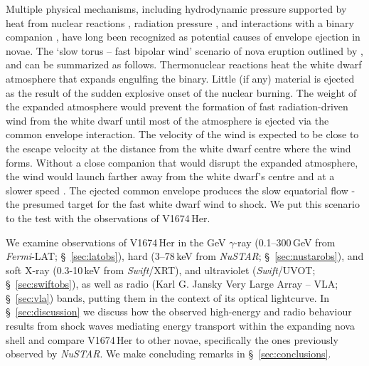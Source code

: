 \documentclass[a4paper,fleqn,usenatbib]{mnras}
\newcommand{\nova}{V1674\,Her}
\newcommand{\fermilat}{\emph{Fermi}-LAT}
\begin{document}
%
Multiple physical mechanisms, including 
hydrodynamic pressure supported by heat from nuclear reactions 
\citep{1969ApJ...156..569S,1978ApJ...226..186S,1986ApJ...310..222P}, 
radiation pressure \citep{1976MNRAS.175..305B,1978ApJ...220.1063S,1994ApJ...437..802K,2001MNRAS.326..126S}, 
and interactions with a binary companion
\citep{1985ApJ...294..263M,1990LNP...369..342L,1990ApJ...356..250L}, 
have long been recognized as potential causes of envelope ejection in novae.
%
The `slow torus -- fast bipolar wind' scenario of nova eruption outlined 
by \cite{1990LNP...369..342L,2014Natur.514..339C,2021ARA&A..59..391C,2019PhT....72k..38M}, and \cite{2022ApJ...938...31S} can be summarized as follows.
%
Thermonuclear reactions heat the white dwarf atmosphere that expands engulfing the binary. 
Little (if any) material is ejected 
as the result of the sudden explosive onset of the nuclear burning.
%
The weight of the expanded atmosphere would prevent the formation of fast radiation-driven wind from the white dwarf 
until most of the atmosphere is ejected via the common envelope interaction.
The velocity of the wind is expected to be close to the escape 
velocity at the distance from the white dwarf centre where the wind forms.
Without a close companion that would disrupt the expanded atmosphere, 
the wind would launch farther away from the white dwarf's centre and at a slower speed \citep{2022ApJ...938...31S}.
%
The ejected common envelope produces the slow equatorial
flow - the presumed target for the fast white dwarf wind to shock. 
%
We put this scenario to the test with the observations of \nova{}.


%

We examine observations of \nova{} in the GeV $\gamma$-ray (0.1--300\,GeV from \fermilat{}; \S~\ref{sec:latobs}),
hard (3--78\,keV from {\em NuSTAR}; \S~\ref{sec:nustarobs}), and soft X-ray 
(0.3-10\,keV from {\em Swift}/XRT), and ultraviolet ({\em Swift}/UVOT; \S~\ref{sec:swiftobs}), 
as well as radio (Karl G. Jansky Very Large Array -- VLA; \S~\ref{sec:vla}) bands, putting them in the context of its optical lightcurve. 
In \S~\ref{sec:discussion} we discuss how the observed high-energy and radio behaviour results 
from shock waves mediating energy transport within the expanding nova shell 
and compare \nova{} to other novae, specifically the ones previously observed by {\em NuSTAR}. 
We make concluding remarks in \S~\ref{sec:conclusions}. 
\end{document}
